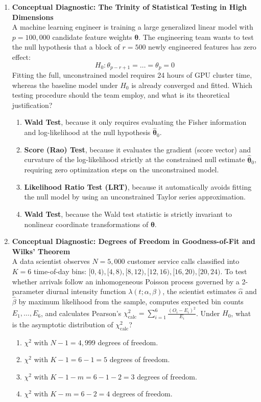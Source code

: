 \begin{enumerate}[resume]
\item \textbf{Conceptual Diagnostic: The Trinity of Statistical Testing in High Dimensions} \\
A machine learning engineer is training a large generalized linear model with $p = 100{,}000$ candidate feature weights $\boldsymbol{\theta}$. The engineering team wants to test the null hypothesis that a block of $r = 500$ newly engineered features has zero effect:
$$H_0 \colon \theta_{p-r+1} = \dots = \theta_p = 0$$
Fitting the full, unconstrained model requires 24 hours of GPU cluster time, whereas the baseline model under $H_0$ is already converged and fitted. Which testing procedure should the team employ, and what is its theoretical justification?
\begin{enumerate}
    \item \textbf{Wald Test}, because it only requires evaluating the Fisher information and log-likelihood at the null hypothesis $\hat{\boldsymbol{\theta}}_0$.
    \item \textbf{Score (Rao) Test}, because it evaluates the gradient (score vector) and curvature of the log-likelihood strictly at the constrained null estimate $\hat{\boldsymbol{\theta}}_0$, requiring zero optimization steps on the unconstrained model.
    \item \textbf{Likelihood Ratio Test (LRT)}, because it automatically avoids fitting the null model by using an unconstrained Taylor series approximation.
    \item \textbf{Wald Test}, because the Wald test statistic is strictly invariant to nonlinear coordinate transformations of $\boldsymbol{\theta}$.
\end{enumerate}

\item \textbf{Conceptual Diagnostic: Degrees of Freedom in Goodness-of-Fit and Wilks' Theorem} \\
A data scientist observes $N = 5{,}000$ customer service calls classified into $K = 6$ time-of-day bins: $[0, 4), [4, 8), [8, 12), [12, 16), [16, 20), [20, 24)$. To test whether arrivals follow an inhomogeneous Poisson process governed by a 2-parameter diurnal intensity function $\lambda(t; \alpha, \beta)$, the scientist estimates $\hat{\alpha}$ and $\hat{\beta}$ by maximum likelihood from the sample, computes expected bin counts $E_1, \dots, E_6$, and calculates Pearson's $\chi_{\text{calc}}^2 = \sum_{i=1}^6 \frac{(O_i - E_i)^2}{E_i}$. Under $H_0$, what is the asymptotic distribution of $\chi_{\text{calc}}^2$?
\begin{enumerate}
    \item $\chi^2$ with $N - 1 = 4{,}999$ degrees of freedom.
    \item $\chi^2$ with $K - 1 = 6 - 1 = 5$ degrees of freedom.
    \item $\chi^2$ with $K - 1 - m = 6 - 1 - 2 = 3$ degrees of freedom.
    \item $\chi^2$ with $K - m = 6 - 2 = 4$ degrees of freedom.
\end{enumerate}
\end{enumerate}
